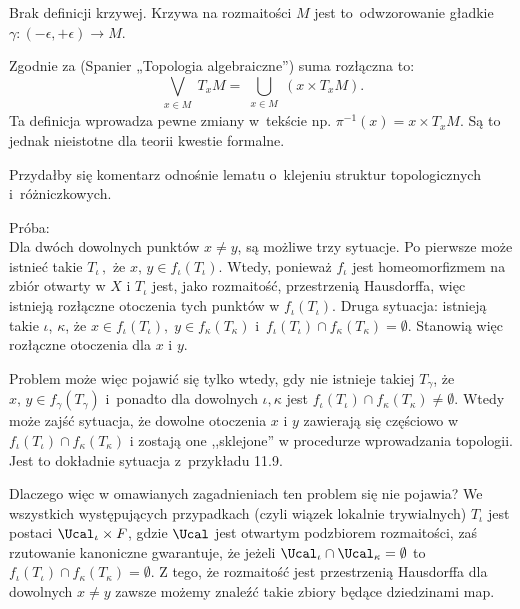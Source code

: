 \documentclass[a4paper,11pt]{article}
\numberwithin{equation}{section}
\begin{document}
\noindent
{} Brak definicji krzywej. Krzywa na rozmaitości $M$ jest
to~odwzorowanie gładkie $\gamma : ( -\epsilon, +\epsilon ) \to M$.

\vspace{\spaceFour}





\noindent
{} Zgodnie za \cite{} (Spanier „Topologia algebraiczne”) suma
rozłączna to:
\begin{equation}
  \label{eq:Gancarzewicz-ZarysETC-s01-01}
  \bigvee_{ \substack{ x \in M } } T_{ x } M
  = \bigcup_{ \substack{ x \in M } }( x \times T_{ x } M ).
\end{equation}
Ta definicja wprowadza pewne zmiany w~tekście np.
$\pi^{ -1 }( x ) = x \times T_{ x }M$. Są to jednak nieistotne dla
teorii kwestie formalne.

\vspace{\spaceFour}





\noindent
{} Przydałby się komentarz odnośnie lematu o~klejeniu struktur
topologicznych i~różniczkowych.

Próba: \\
Dla dwóch dowolnych punktów $x \neq y$, są możliwe trzy sytuacje. Po
pierwsze może istnieć takie $T_{ \iota } \, ,$ że
$x, \, y \in f_{ \iota }( T_{ \iota } )$. Wtedy, ponieważ
$f_{ \iota }$ jest homeomorfizmem na zbiór otwarty w $X$ i $T_{ \iota }$
jest, jako rozmaitość, przestrzenią Hausdorffa, więc istnieją
rozłączne otoczenia tych punktów w $f_{ \iota } ( T_{ \iota } )$.
Druga sytuacja: istnieją takie $\iota$, $\kappa$, że
$x \in f_{ \iota } ( T_{ \iota } ), \; y \in f_{ \kappa } ( T_{ \kappa } )$
i~$f_{ \iota } ( T_{ \iota } ) \cap f_{ \kappa } ( T_{ \kappa } ) = \emptyset$.
Stanowią więc rozłączne otoczenia dla $x$ i $y$.

Problem może więc pojawić się tylko wtedy, gdy nie istnieje takiej
$T_{ \gamma }$, że $x, \, y \in f_{ \gamma }( T_{ \gamma } )$
i~ponadto dla dowolnych $\iota, \kappa$ jest
$f_{ \iota } ( T_{ \iota } ) \cap f_{ \kappa } ( T_{ \kappa } ) \neq \emptyset$. Wtedy może zajść sytuacja,
że dowolne otoczenia $x$ i $y$
zawierają się częściowo w
$f_{ \iota } ( T_{ \iota } ) \cap f_{ \kappa } ( T_{ \kappa } )$ i
zostają one ,,sklejone'' w procedurze wprowadzania topologii. Jest to
dokładnie sytuacja z~przykładu 11.9.

Dlaczego więc w omawianych zagadnieniach ten problem się nie
pojawia? We wszystkich występujących przypadkach (czyli wiązek
lokalnie trywialnych) $T_{ \iota }$ jest postaci
$\Ucal_{ \iota } \times F$, gdzie $\Ucal$ jest otwartym
podzbiorem rozmaitości, zaś rzutowanie kanoniczne gwarantuje, że
jeżeli $\Ucal_{ \iota } \cap \Ucal_{ \kappa } = \emptyset$ to
$f_{ \iota } (T_{ \iota }) \cap f_{ \kappa }(T_{ \kappa }) = \emptyset$. Z tego, że rozmaitość jest
przestrzenią Hausdorffa dla
dowolnych $x \neq y$ zawsze możemy znaleźć takie zbiory będące
dziedzinami map.
\end{document}
